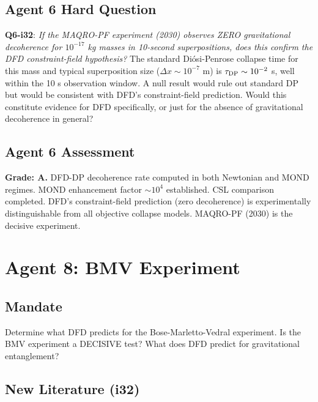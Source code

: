 \documentclass[11pt,a4paper]{article}
\begin{document}
\subsection{Agent 6 Hard Question}

\textbf{Q6-i32}: \emph{If the MAQRO-PF experiment (2030) observes ZERO gravitational decoherence for $10^{-17}$ kg masses in 10-second superpositions, does this confirm the DFD constraint-field hypothesis?} The standard Di\'{o}si-Penrose collapse time for this mass and typical superposition size ($\Delta x \sim 10^{-7}$ m) is $\tau_{\rm DP} \sim 10^{-2}$ s, well within the 10 s observation window. A null result would rule out standard DP but would be consistent with DFD's constraint-field prediction. Would this constitute evidence for DFD specifically, or just for the absence of gravitational decoherence in general?

\subsection{Agent 6 Assessment}

\textbf{Grade: A.} DFD-DP decoherence rate computed in both Newtonian and MOND regimes. MOND enhancement factor $\sim 10^4$ established. CSL comparison completed. DFD's constraint-field prediction (zero decoherence) is experimentally distinguishable from all objective collapse models. MAQRO-PF (2030) is the decisive experiment.


\newpage
\section{Agent 8: BMV Experiment}
\label{sec:agent8}

\subsection{Mandate}

Determine what DFD predicts for the Bose-Marletto-Vedral experiment. Is the BMV experiment a DECISIVE test? What does DFD predict for gravitational entanglement?

\subsection{New Literature (i32)}
\end{document}
